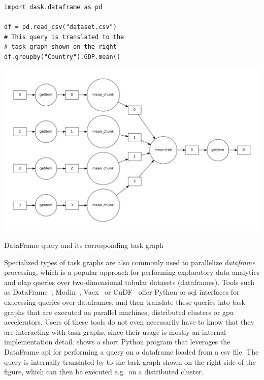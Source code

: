 \begin{listing}[h]
	\begin{minipage}{.4\linewidth}
		\begin{verbatim}
import dask.dataframe as pd

df = pd.read_csv("dataset.csv")
# This query is translated to the
# task graph shown on the right
df.groupby("Country").GDP.mean()
	\end{verbatim}
	\end{minipage}
	\begin{minipage}{.6\linewidth}
		\includegraphics[width=\linewidth]{imgs/dask-dataframe-1-graph}
	\end{minipage}
	\caption{\dask{} DataFrame query and its corresponding task graph}
	\label{lst:dask-dataframe-example-1}
\end{listing}

Specialized types of task graphs are also commonly used to parallelize \emph{dataframe}
processing, which is a popular approach for performing exploratory data analytics and
\gls{olap} queries over two-dimensional tabular datasets (dataframes). Tools such as
\dask{} DataFrame~\cite{dask}, Modin~\cite{modin},
Vaex~\cite{vaex} or CuDF~\cite{cudf} offer Python or
\gls{sql} interfaces for expressing queries over dataframes, and then translate these
queries into task graphs that are executed on parallel machines, distributed clusters or
\gls{gpu} accelerators. Users of these tools do not even necessarily have to know
that they are interacting with task graphs, since their usage is mostly an internal implementation
detail.  shows a short Python program that leverages the
\dask{} DataFrame \gls{api} for performing a query on a dataframe
loaded from a \gls{csv} file. The query is internally translated by
\dask{} to the task graph shown on the right side of the figure, which can then be
executed e.g.\ on a distributed cluster.

